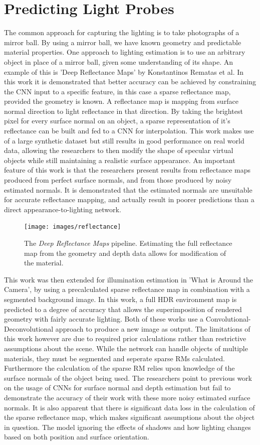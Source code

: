 \documentclass[ %
                    author={Gavin Parker},
                supervisor={Dr. Neill Campbell},
                    degree={MEng},
                     title={Deep Siamese Networks for Illumination Estimation from Stereo Images},
                  subtitle={},
                      type={Research},
                      year={2018} ]{dissertation}
\begin{document}
\section{Predicting Light Probes}
The common approach for capturing the lighting is to take photographs of a mirror ball. By using a mirror ball, we have known geometry and predictable material properties. One approach to lighting estimation is to use an arbitrary object in place of a mirror ball, given some understanding of its shape. An example of this is 'Deep Reflectance Maps' \cite{RematasCVPR2016} by Konstantinos Rematas et al. In this work it is demonstrated that better accuracy can be achieved by constraining the CNN input to a specific feature, in this case a sparse reflectance map, provided the geometry is known. A reflectance map is mapping from surface normal direction to light reflectance in that direction. By taking the brightest pixel for every surface normal on an object, a sparse representation of it's reflectance can be built and fed to a CNN for interpolation. This work makes use of a large synthetic dataset but still results in good performance on real world data, allowing the researchers to then modify the shape of specular virtual objects while still maintaining a realistic surface appearance. An important feature of this work is that the researchers present results from reflectance maps produced from perfect surface normals, and from those produced by noisy estimated normals. It is demonstrated that the estimated normals are unsuitable for accurate reflectance mapping, and actually result in poorer predictions than a direct appearance-to-lighting network.
\begin{figure}[H]
\texttt{[image: images/reflectance]}
\centering
\caption{The \textit{Deep Reflectance Maps} pipeline. Estimating the full reflectance map from the geometry and depth data allows for modification of the material.}
\end{figure}
This work was then extended for illumination estimation in 'What is Around the Camera', by using a precalculated sparse reflectance map in combination with a segmented background image. In this work, a full HDR environment map is predicted to a degree of accuracy that allows the superimposition of rendered geometry with fairly accurate lighting. Both of these works use a Convolutional-Deconvolutional approach to produce a new image as output. The limitations of this work however are due to required prior calculations rather than restrictive assumptions about the scene. While the network can handle objects of multiple materials, they must be segmented and seperate sparse RMs calculated. Furthermore the calculation of the sparse RM relies upon knowledge of the surface normals of the object being used. The researchers point to previous work on the usage of CNNs for surface normal and depth estimation but fail to demonstrate the accuracy of their work with these more noisy estimated surface normals. It is also apparent that there is significant data loss in the calculation of the sparse reflectance map, which makes significant assumptions about the object in question. The model ignoring the effects of shadows and how lighting changes based on both position and surface orientation.
\end{document}
